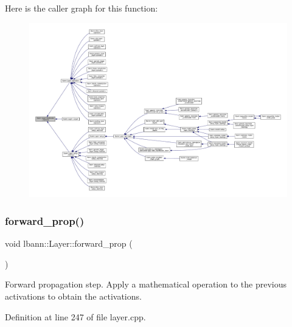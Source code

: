 Here is the caller graph for this function\+:\nopagebreak
\begin{figure}[H]
\begin{center}
\leavevmode
\includegraphics[width=350pt]{classlbann_1_1Layer_a888392d6ac6906093a8125c6a37de075_icgraph}
\end{center}
\end{figure}
\mbox{\label{classlbann_1_1Layer_a2483ccd8a4406a6891f6176f1001b4e5}} 
\subsubsection{\texorpdfstring{forward\+\_\+prop()}{forward\_prop()}}
{\footnotesize\ttfamily void lbann\+::\+Layer\+::forward\+\_\+prop (\begin{DoxyParamCaption}{ }\end{DoxyParamCaption})\hspace{0.3cm}{\ttfamily [virtual]}}

Forward propagation step. Apply a mathematical operation to the previous activations to obtain the activations. 

Definition at line 247 of file layer.\+cpp.


